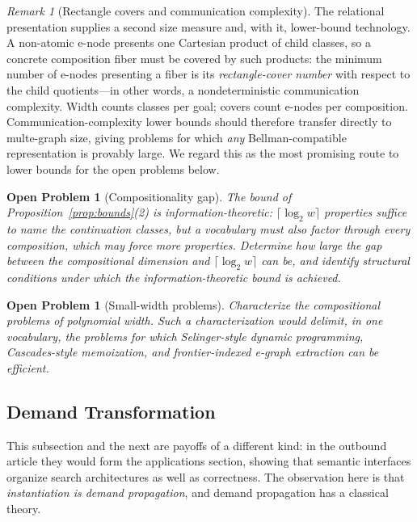 \documentclass[sigconf,nonacm]{acmart}
\theoremstyle{definition}
\theoremstyle{plain}
\newtheorem{openproblem}[definition]{Open Problem}
\theoremstyle{remark}
\newtheorem{remark}[definition]{Remark}
\begin{document}
\begin{remark}[Rectangle covers and communication complexity]
\label{rem:rectangles}
The relational presentation supplies a second size measure and,
with it, lower-bound technology.  A non-atomic e-node presents one
Cartesian product of child classes, so a concrete composition fiber
must be covered by such products: the minimum number of e-nodes
presenting a fiber is its \emph{rectangle-cover number} with respect
to the child quotients---in other words, a nondeterministic
communication complexity.  Width counts classes per goal; covers
count e-nodes per composition.  Communication-complexity lower
bounds should therefore transfer directly to multe-graph size,
giving problems for which \emph{any} Bellman-compatible
representation is provably large.  We regard this as the most
promising route to lower bounds for the open problems below.
\end{remark}

\begin{openproblem}[Compositionality gap]
\label{open:gap}
The bound of Proposition~\ref{prop:bounds}(2) is
information-theoretic: $\lceil\log_2 w\rceil$ properties suffice to
\emph{name} the continuation classes, but a vocabulary must also
factor through every composition, which may force more properties.
Determine how large the gap between the compositional dimension and
$\lceil\log_2 w\rceil$ can be, and identify structural conditions
under which the information-theoretic bound is achieved.
\end{openproblem}

\begin{openproblem}[Small-width problems]
\label{open:width}
Characterize the compositional problems of polynomial width.  Such a
characterization would delimit, in one vocabulary, the problems for
which Selinger-style dynamic programming, Cascades-style
memoization, and frontier-indexed e-graph extraction can be
efficient.
\end{openproblem}

\subsection{Demand Transformation}
\label{sec:demand}

This subsection and the next are payoffs of a different kind: in the
outbound article they would form the applications section, showing
that semantic interfaces organize search architectures as well as
correctness.  The observation here is that \emph{instantiation is
demand propagation}, and demand propagation has a classical theory.
\end{document}
